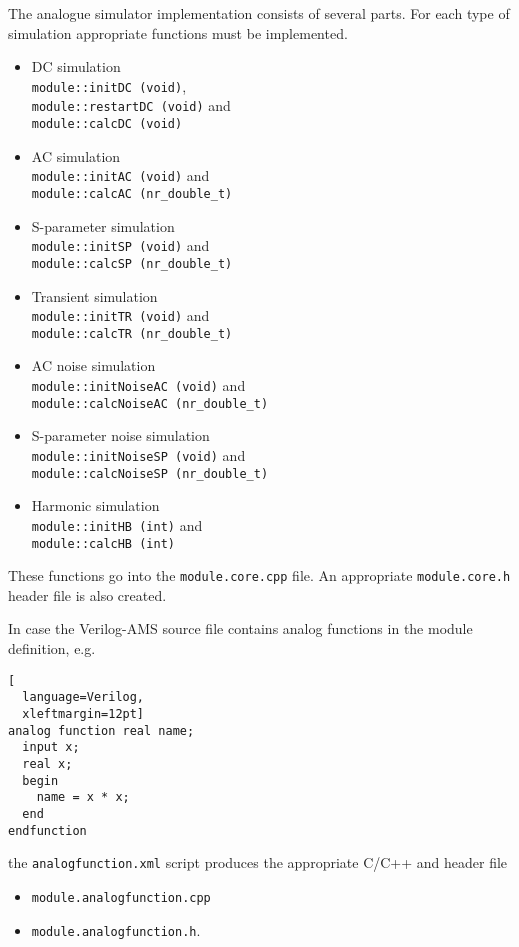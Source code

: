 
The analogue simulator implementation consists of several parts.  For
each type of simulation appropriate functions must be implemented.
\begin{itemize}
\item DC simulation\\
\verb+module::initDC (void)+,\\
\verb+module::restartDC (void)+ and\\
\verb+module::calcDC (void)+
\item AC simulation\\
\verb+module::initAC (void)+ and\\
\verb+module::calcAC (nr_double_t)+
\item S-parameter simulation\\
\verb+module::initSP (void)+ and\\
\verb+module::calcSP (nr_double_t)+
\item Transient simulation\\
\verb+module::initTR (void)+ and\\
\verb+module::calcTR (nr_double_t)+
\item AC noise simulation\\
\verb+module::initNoiseAC (void)+ and\\
\verb+module::calcNoiseAC (nr_double_t)+
\item S-parameter noise simulation\\
\verb+module::initNoiseSP (void)+ and\\
\verb+module::calcNoiseSP (nr_double_t)+
\item Harmonic simulation\\
\verb+module::initHB (int)+ and\\
\verb+module::calcHB (int)+
\end{itemize}

These functions go into the \verb+module.core.cpp+ file.  An
appropriate \verb+module.core.h+ header file is also created.

\addvspace{12pt}

In case the Verilog-AMS source file contains analog functions in the
module definition, e.g.
\begin{lstlisting}[
  language=Verilog,
  xleftmargin=12pt]
analog function real name;
  input x;
  real x;
  begin
    name = x * x;
  end
endfunction
\end{lstlisting}

the \verb+analogfunction.xml+ script produces the appropriate C/C++
and header file
\begin{itemize}
\item \verb+module.analogfunction.cpp+
\item \verb+module.analogfunction.h+.
\end{itemize}

